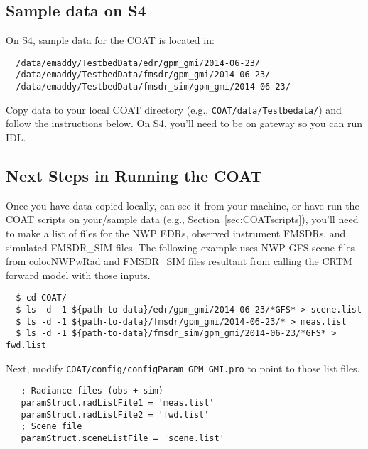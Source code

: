 \documentclass[10pt]{report}
\begin{document}
\subsection{Sample data on S4}\label{ssec:S4Samp}
On S4, sample data for the COAT is located in:
\begin{verbatim}
  /data/emaddy/TestbedData/edr/gpm_gmi/2014-06-23/
  /data/emaddy/TestbedData/fmsdr/gpm_gmi/2014-06-23/
  /data/emaddy/TestbedData/fmsdr_sim/gpm_gmi/2014-06-23/
\end{verbatim}
Copy data to your local COAT directory (e.g., {\tt COAT/data/Testbedata/}) and 
follow the instructions below.  On S4, you'll need to be on gateway so you can run IDL.  

\subsection{Next Steps in Running the COAT}\label{ssec:nextStep}
Once you have data copied locally, can see it from your machine, or have run the COAT scripts on your/sample data 
(e.g., Section~\ref{sec:COATscripts}), you'll need to make a list of files for 
the NWP EDRs, observed instrument FMSDRs, and simulated FMSDR\_SIM files.  The following example uses
NWP GFS scene files from colocNWPwRad and FMSDR\_SIM files resultant from calling the CRTM forward model with 
those inputs.
\begin{verbatim}
  $ cd COAT/
  $ ls -d -1 ${path-to-data}/edr/gpm_gmi/2014-06-23/*GFS* > scene.list
  $ ls -d -1 ${path-to-data}/fmsdr/gpm_gmi/2014-06-23/* > meas.list
  $ ls -d -1 ${path-to-data}/fmsdr_sim/gpm_gmi/2014-06-23/*GFS* > fwd.list
\end{verbatim}
Next, modify {\tt COAT/config/configParam\_GPM\_GMI.pro} to point to those list files\footnotemark.
  
\begin{verbatim}
   ; Radiance files (obs + sim)
   paramStruct.radListFile1 = 'meas.list'
   paramStruct.radListFile2 = 'fwd.list'
   ; Scene file
   paramStruct.sceneListFile = 'scene.list'
\end{verbatim}
\end{document}
